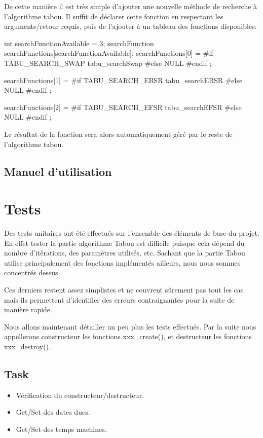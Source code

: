 \documentclass[hideweeklyreports]{polytech/polytech}
\begin{document}
				De cette manière il est très simple d'ajouter une nouvelle méthode de recherche à l'algorithme tabou. Il suffit de déclarer cette fonction en respectant les arguments/retour requis, puis de l'ajouter à un tableau des fonctions disponibles:
				\begin{csource}
int searchFunctionAvailable = 3;
searchFunction searchFunctions[searchFunctionAvailable];
searchFunctions[0] =
	#if TABU_SEARCH_SWAP
		tabu_searchSwap
	#else
		NULL
	#endif
;

searchFunctions[1] =
	#if TABU_SEARCH_EBSR
		tabu_searchEBSR
	#else
		NULL
	#endif
;

searchFunctions[2] =
	#if TABU_SEARCH_EFSR
		tabu_searchEFSR
	#else
		NULL
	#endif
;
				\end{csource}
			
				Le résultat de la fonction sera alors automatiquement géré par le reste de l'algorithme tabou.
			
			\subsection{Manuel d'utilisation}
		
		\section{\label{unit}Tests}
			Des tests unitaires ont été effectués sur l'ensemble des éléments de base du projet. En effet tester la partie algorithme Tabou est difficile puisque cela dépend du nombre d'itérations, des paramètres utilisés, etc. Sachant que la partie Tabou utilise principalement des fonctions implémentés ailleurs, nous nous sommes concentrés dessus.
			
			Ces derniers restent assez simplistes et ne couvrent sûrement pas tout les cas mais ils permettent d'identifier des erreurs contraignantes pour la suite de manière rapide.
			
			Nous allons maintenant détailler un peu plus les tests effectués. Par la suite nous appellerons constructeur les fonctions xxx\_create(), et destructeur les fonctions xxx\_destroy().
			\subsection{Task}
				\begin{itemize}
					\item Vérification du constructeur/destructeur.
					\item Get/Set des dates dues.
					\item Get/Set des temps machines.
				\end{itemize}
				
\end{document}
